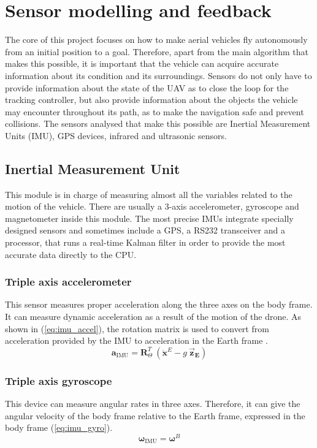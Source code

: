 \documentclass[journal]{IEEEtran}
\newcommand*{\subb}[1]{_{\mathrm{#1}}}
\begin{document}
	\section{Sensor modelling and feedback}
	The core of this project focuses on how to make aerial vehicles fly autonomously from an initial position to a goal. Therefore, apart from the main algorithm that makes this possible, it is important that the vehicle can acquire accurate information about its condition and its surroundings. Sensors do not only have to provide information about the state of the UAV as to close the loop for the tracking controller, but also provide information about the objects the vehicle may encounter throughout its path, as to make the navigation safe and prevent collisions. The sensors analysed that make this possible are Inertial Measurement Units (IMU), GPS devices, infrared and ultrasonic sensors.\\
	
	\subsection{Inertial Measurement Unit}
	This module is in charge of measuring almost all the variables related to the motion of the vehicle. There are usually a 3-axis accelerometer, gyroscope and magnetometer inside this module. The most precise IMUs integrate specially designed sensors and sometimes include a GPS, a RS232 transceiver and a processor, that runs a real-time Kalman filter in order to provide the most accurate data directly to the CPU. \\
	
	
	\subsubsection{Triple axis accelerometer} This sensor measures proper acceleration along the three axes on the body frame. It can measure dynamic acceleration as a result of the motion of the drone.  As shown in (\ref{eq:imu_accel}), the rotation matrix is used to convert from acceleration provided by the IMU to acceleration in the Earth frame \cite{modelling_control_mahony}.\\
	\begin{equation} \label{eq:imu_accel}
	\bm{a}\subb{IMU}= \bm{R}^T_\Theta \ (\bm{\ddot{x}}^E - g \ \bm{\vec{z}_E})
	\end{equation}
	
	\subsubsection{Triple axis gyroscope} This device can measure angular rates in three axes. Therefore, it can give the angular velocity of the body frame relative to the Earth frame, expressed in the body frame (\ref{eq:imu_gyro}).\\
	\begin{equation} \label{eq:imu_gyro}
	\bm{\omega}\subb{IMU}= \bm{\omega}^B 
	\end{equation}
	
\end{document}
